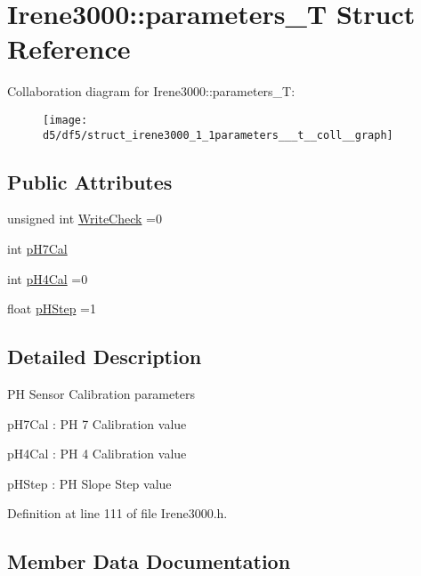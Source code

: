 \hypertarget{struct_irene3000_1_1parameters___t}{}\section{Irene3000\+:\+:parameters\+\_\+T Struct Reference}
\label{struct_irene3000_1_1parameters___t}


Collaboration diagram for Irene3000\+:\+:parameters\+\_\+T\+:\nopagebreak
\begin{figure}[H]
\begin{center}
\leavevmode
\texttt{[image: d5/df5/struct\_irene3000\_1\_1parameters\_\_\_t\_\_coll\_\_graph]}
\end{center}
\end{figure}
\subsection*{Public Attributes}
\begin{DoxyCompactItemize}
\item 
unsigned int \hyperlink{struct_irene3000_1_1parameters___t_a56f1f14d33a69300d580eda2dc52cecd}{Write\+Check} =0
\item 
int \hyperlink{struct_irene3000_1_1parameters___t_a21265466a570d84bff914f26d2f7a03e}{p\+H7\+Cal}
\item 
int \hyperlink{struct_irene3000_1_1parameters___t_a1144de6fb54eb3e1dd2a3d8c2afc97dc}{p\+H4\+Cal} =0
\item 
float \hyperlink{struct_irene3000_1_1parameters___t_a61cfcc2539d5f630e9071f3753aba9fe}{p\+H\+Step} =1
\end{DoxyCompactItemize}


\subsection{Detailed Description}
PH Sensor Calibration parameters

p\+H7\+Cal \+: PH 7 Calibration value

p\+H4\+Cal \+: PH 4 Calibration value

p\+H\+Step \+: PH Slope Step value 

Definition at line 111 of file Irene3000.\+h.



\subsection{Member Data Documentation}
\mbox{\label{struct_irene3000_1_1parameters___t_a1144de6fb54eb3e1dd2a3d8c2afc97dc}} 
